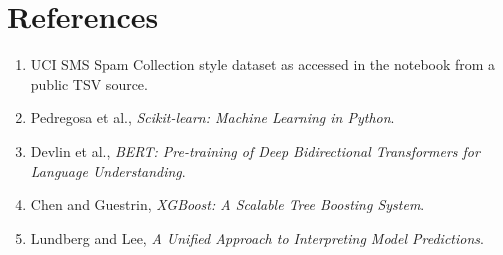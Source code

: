 \documentclass[12pt,a4paper]{article}
\begin{document}
\section*{References}
\begin{enumerate}[leftmargin=1.5em]
    \item UCI SMS Spam Collection style dataset as accessed in the notebook from a public TSV source.
    \item Pedregosa et al., \textit{Scikit-learn: Machine Learning in Python}.
    \item Devlin et al., \textit{BERT: Pre-training of Deep Bidirectional Transformers for Language Understanding}.
    \item Chen and Guestrin, \textit{XGBoost: A Scalable Tree Boosting System}.
    \item Lundberg and Lee, \textit{A Unified Approach to Interpreting Model Predictions}.
\end{enumerate}
\end{document}
